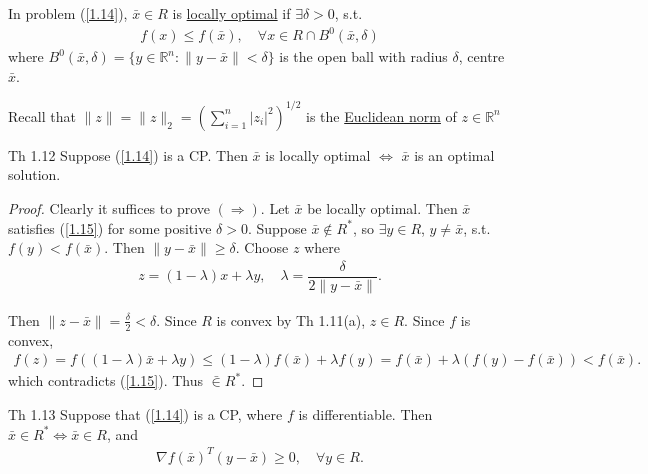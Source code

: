 \begin{definition}
    In problem (\ref{1.14}), $\bar{x}\in R$ is \underline{locally optimal} if $\exists\delta>0$, s.t.
    \begin{align}
        f(x) \le f(\bar{x}), \quad \forall x\in R\cap B^0(\bar{x}, \delta)\label{1.15}
    \end{align}
    where $B^0(\bar{x}, \delta) = \{ y\in \mathbb{R}^n: \|y-\bar{x}\| <\delta\}$ is the open ball with radius $\delta$, centre $\bar{x}$.
\end{definition}

\begin{remark}
    Recall that $\|z\| = \|z\|_2 = \left(\sum\limits_{i=1}^n |z_i|^2\right)^{1/2}$ is the \underline{Euclidean norm} of $z\in\mathbb{R}^n$
\end{remark}

\begin{theorem}
    Th 1.12 Suppose (\ref{1.14}) is a CP. Then $\bar{x}$ is locally optimal $\Longleftrightarrow$ $\bar{x}$ is an optimal solution.
\end{theorem}
\begin{proof}
    Clearly it suffices to prove $\left(\Longrightarrow\right)$. Let $\bar{x}$ be locally optimal. Then $\bar{x}$ satisfies (\ref{1.15}) for some positive $\delta > 0$. Suppose $\bar{x}\notin R^*$, so $\exists y\in R$, $y\neq \bar{x}$, s.t. $f(y)<f(\bar{x})$. Then $\| y-\bar{x}\| \ge \delta$. Choose $z$ where 
    \begin{align*}
        z = (1-\lambda)x + \lambda y, \quad \lambda = \dfrac{\delta}{2\|y-\bar{x}\|}.
    \end{align*}

    Then $\|z-\bar{x}\| = \frac{\delta}{2} < \delta$. Since $R$ is convex by Th 1.11(a), $z\in R$. Since $f$ is convex, 
    \begin{align*}
        f(z) = f\left( (1-\lambda)\bar{x} + \lambda y\right) \le (1-\lambda) f(\bar{x}) + \lambda f(y) = f(\bar{x}) + \lambda\left(f(y) - f(\bar{x})\right) < f(\bar{x}).
    \end{align*}
    which contradicts (\ref{1.15}). Thus $\bar\in R^*$.
\end{proof}

\begin{theorem}
    Th 1.13 Suppose that (\ref{1.14}) is a CP, where $f$ is differentiable. Then $\bar{x}\in R^* \Longleftrightarrow \bar{x}\in R$, and
    \begin{align}
        \nabla f(\bar{x})^T (y-\bar{x}) \ge 0, \quad \forall y\in R.\label{1.16}
    \end{align}
\end{theorem}

